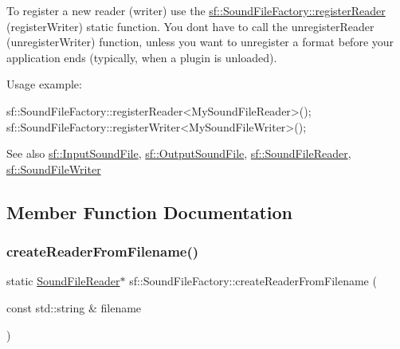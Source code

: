 To register a new reader (writer) use the \hyperlink{classsf_1_1_sound_file_factory_acaf1f0bf1b7c7b9988ec76b33e33fe95}{sf\+::\+Sound\+File\+Factory\+::register\+Reader} (register\+Writer) static function. You don\textquotesingle{}t have to call the unregister\+Reader (unregister\+Writer) function, unless you want to unregister a format before your application ends (typically, when a plugin is unloaded).

Usage example\+: 
\begin{DoxyCode}
sf::SoundFileFactory::registerReader<MySoundFileReader>();
sf::SoundFileFactory::registerWriter<MySoundFileWriter>();
\end{DoxyCode}


\begin{DoxySeeAlso}{See also}
\hyperlink{classsf_1_1_input_sound_file}{sf\+::\+Input\+Sound\+File}, \hyperlink{classsf_1_1_output_sound_file}{sf\+::\+Output\+Sound\+File}, \hyperlink{classsf_1_1_sound_file_reader}{sf\+::\+Sound\+File\+Reader}, \hyperlink{classsf_1_1_sound_file_writer}{sf\+::\+Sound\+File\+Writer} 
\end{DoxySeeAlso}


\subsection{Member Function Documentation}
\mbox{\label{classsf_1_1_sound_file_factory_af0a87110e0b8a77aada17b22a016c066}} 
\subsubsection{\texorpdfstring{create\+Reader\+From\+Filename()}{createReaderFromFilename()}}
{\footnotesize\ttfamily static \hyperlink{classsf_1_1_sound_file_reader}{Sound\+File\+Reader}$\ast$ sf\+::\+Sound\+File\+Factory\+::create\+Reader\+From\+Filename (\begin{DoxyParamCaption}\item[{const std\+::string \&}]{filename }\end{DoxyParamCaption})\hspace{0.3cm}{\ttfamily [static]}}



